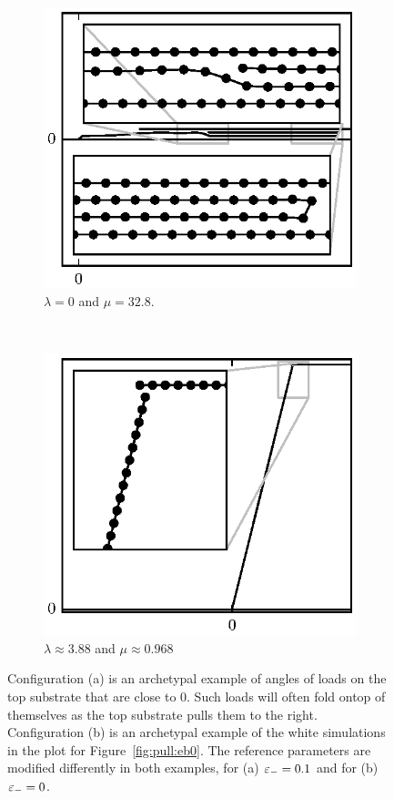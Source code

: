 	\begin{figure}
		\centering
		\begin{subfigure}{.5\textwidth}
			\centering
			\includegraphics{./fig/ch3/pull/eb0.1/l0_m32.8.eps}
			\caption{$\lambda=0$ and $\mu=32.8$. \label{subfig:folded_over}}
		\end{subfigure}%
		~
		\begin{subfigure}{.5\textwidth}
			\centering
			\includegraphics{./fig/ch3/pull/eb0/t76_m4.eps}
			\caption{$\lambda\approx3.88$ and $\mu\approx0.968$\label{subfig:barely_adhered}}
		\end{subfigure}
		\caption{Configuration (a) is an archetypal example of angles of loads on the top substrate that are close to 0. Such loads will often fold ontop of themselves as the top substrate pulls them to the right. Configuration (b) is an archetypal example of the white simulations in the plot for Figure~\ref{fig:pull:eb0}. The reference parameters are modified differently in both examples, for (a) $\varepsilon_-=0.1$ and for (b) $\varepsilon_-=0$.\label{fig:pull_equil}}	
	\end{figure}

